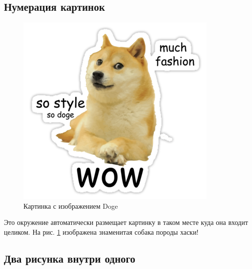 \documentclass[12pt, a4paper]{article}
\begin{document}
\subsection{Нумерация картинок}


\begin{figure}[H]
\begin{center}
\includegraphics[width=0.3\textheight]{doge.png}
\end{center}
\caption{Картинка с изображением Doge}\label{pic:doge}
\end{figure}

Это окружение автоматически размещает картинку в таком месте куда она входит целиком. На рис. \ref{pic:doge} изображена знаменитая собака породы хаски!


\subsection{Два рисунка внутри одного}
\end{document}
